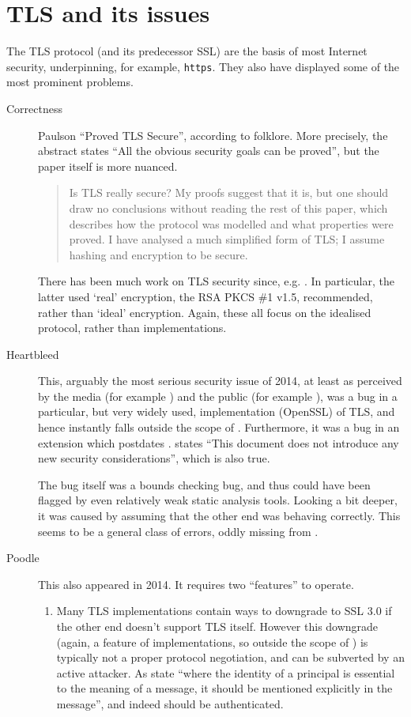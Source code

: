 \documentclass{llncs}
\begin{document}
\section{TLS and its issues}
The TLS protocol \cite{Rescorla2018a} (and its predecessor SSL) are the basis of most Internet security, underpinning, for example, \verb+https+. They also have displayed some of the most prominent problems.
\begin{description}
\item[Correctness]Paulson \cite{Paulson1999} ``Proved TLS Secure'', according to folklore. More precisely, the abstract states ``All the
obvious security goals can be proved'', but the paper itself is more nuanced.
\begin{quote}
Is TLS really secure? My proofs suggest that it is, but one should draw no conclusions without reading the rest of this paper, which describes how the protocol
was modelled and what properties were proved. I have analysed a much simplified
form of TLS; I assume hashing and encryption to be secure.
\end{quote}
There has been much work on TLS security since, e.g. \cite{Heetal2005,Krawczyketal2013a}. In particular, the latter used `real' encryption, the RSA PKCS \#1 v1.5, recommended, rather than `ideal' encryption. Again, these all focus on the idealised protocol, rather than implementations.
\item[Heartbleed \cite{NIST2014a}]This, arguably the most serious security issue of 2014, at least as perceived by the media (for example \cite{BBC2014b}) and the public (for example \cite{Steinberg2014a}), was a bug in a particular, but very widely used, implementation (OpenSSL) of TLS, and hence instantly falls outside the scope of \cite{Paulson1999}. Furthermore, it was a bug in an extension \cite{Seggelmannetal2012a} which postdates \cite{Paulson1999}.  \cite{Seggelmannetal2012a} states ``This document does not introduce any new security    considerations'', which is also true.
\par
The bug itself was a bounds checking bug, and thus could have been flagged by even relatively weak static analysis tools.  Looking a bit deeper, it was caused by assuming that the other end was behaving correctly. This seems to be a general class of errors, oddly missing from \cite{AndersonNeedham1995}.
\item[Poodle \cite{Molleretal2014a,NIST2014b}]This also appeared in 2014. It requires two ``features'' to operate.
\begin{enumerate}
\item Many TLS implementations contain ways to downgrade to SSL 3.0 if the other end doesn't support TLS itself. However this downgrade (again, a feature of implementations, so outside the scope of \cite{Paulson1999}) is typically not a proper protocol negotiation, and can be subverted by an active attacker. As \cite{AndersonNeedham1995} state ``where the identity of a principal is essential to the meaning of a message, it should be mentioned explicitly in the message'', and indeed should be authenticated.

\end{enumerate}
\end{description}
\end{document}
